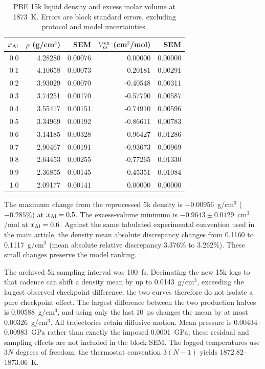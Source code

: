 \documentclass[10pt]{article}
\begin{document}
\begin{table}[htbp]
\centering
\caption{PBE 15k liquid density and excess molar volume at 1873~K. Errors are block standard errors, excluding protocol and model uncertainties.}
\label{tab:density15k}
\begin{tabular}{rrrrr}
\toprule
$x_{\rm Al}$ & $\rho$ (g/cm$^3$) & SEM & $V_m^{\rm ex}$ (cm$^3$/mol) & SEM\\
\midrule
0.0 & 4.28280 & 0.00076 & 0.00000 & 0.00000 \\
0.1 & 4.10658 & 0.00073 & -0.20181 & 0.00291 \\
0.2 & 3.93029 & 0.00070 & -0.40548 & 0.00311 \\
0.3 & 3.74251 & 0.00170 & -0.57790 & 0.00587 \\
0.4 & 3.55417 & 0.00151 & -0.74910 & 0.00596 \\
0.5 & 3.34969 & 0.00192 & -0.86611 & 0.00783 \\
0.6 & 3.14185 & 0.00328 & -0.96427 & 0.01286 \\
0.7 & 2.90467 & 0.00191 & -0.93673 & 0.00969 \\
0.8 & 2.64453 & 0.00255 & -0.77265 & 0.01330 \\
0.9 & 2.36855 & 0.00145 & -0.45351 & 0.01084 \\
1.0 & 2.09177 & 0.00141 & 0.00000 & 0.00000 \\
\bottomrule
\end{tabular}
\end{table}

The maximum change from the reprocessed 5k density is $-0.00956$~g/cm$^3$ ($-0.285\%$) at $x_{\rm Al}=0.5$. The excess-volume minimum is $-0.9643\pm0.0129$~cm$^3$/mol at $x_{\rm Al}=0.6$. Against the same tabulated experimental convention used in the main article, the density mean absolute discrepancy changes from 0.1160 to 0.1117~g/cm$^3$ (mean absolute relative discrepancy 3.376\% to 3.262\%). These small changes preserve the model ranking.

The archived 5k sampling interval was 100~fs. Decimating the new 15k logs to that cadence can shift a density mean by up to 0.0143~g/cm$^3$, exceeding the largest observed checkpoint difference; the two curves therefore do not isolate a pure checkpoint effect. The largest difference between the two production halves is 0.00588~g/cm$^3$, and using only the last 10~ps changes the mean by at most 0.00326~g/cm$^3$. All trajectories retain diffusive motion. Mean pressure is 0.00434--0.00983~GPa rather than exactly the imposed 0.0001~GPa; these residual and sampling effects are not included in the block SEM. The logged temperatures use $3N$ degrees of freedom; the thermostat convention $3(N-1)$ yields 1872.82--1873.06~K.
\end{document}
